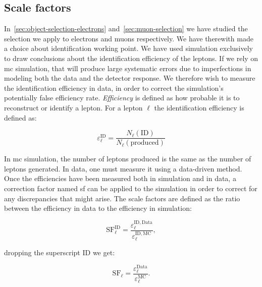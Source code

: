 \clearpage

\subsection{Scale factors}
\label{sec:scale-factors}

In~\ref{sec:object-selection-electrons} and~\ref{sec:muon-selection} we have studied the selection we apply to electrons and muons respectively. We have therewith made a choice about identification working point. We have used simulation exclusively to draw conclusions about the identification efficiency of the leptons. If we rely on \gls{mc} simulation,  that will produce large systematic errors due to imperfections in modeling both the data and the detector response. We therefore wish to measure the identification efficiency in data, in order to correct the simulation's potentially false efficiency rate. \emph{Efficiency} is defined as how probable it is to reconstruct or identify a lepton. For a lepton $\ell$ the identification efficiency is defined as:

\begin{equation}
\varepsilon_{\ell}^{\mathrm{ID}} = \frac{N_{\ell}(\mathrm{ID})}{N_{\ell}(\mathrm{produced})}
\end{equation}

In \gls{mc} simulation, the number of leptons produced is the same as the number of leptons generated. In data, one must measure it using a data-driven method. Once the efficiencies have been measured both in simulation and in data, a correction factor named \gls{sf} can be applied to the simulation in order to correct for any discrepancies that might arise. The scale factors are defined as the ratio between the efficiency in data to the efficiency in simulation:

\begin{equation}
\mathrm{SF}_{\ell}^{\mathrm{ID}}=\frac{\varepsilon_{\ell}^{\mathrm{ID,Data}}}{\varepsilon_{\ell}^{\mathrm{ID,MC}}},
\end{equation}

dropping the superscript ID we get:

\begin{equation}
\mathrm{SF}_{\ell}=\frac{\varepsilon_{\ell}^{\mathrm{Data}}}{\varepsilon_{\ell}^{\mathrm{MC}}}.
\end{equation}


